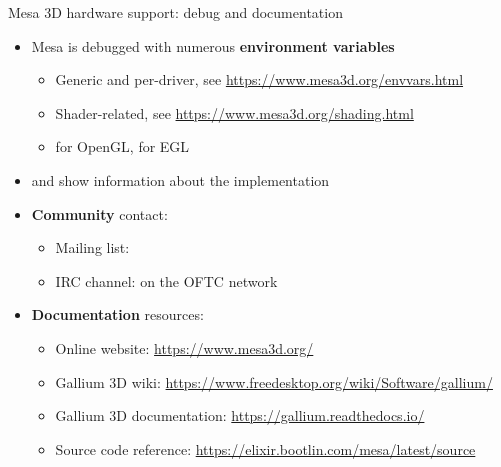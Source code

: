 \begin{frame}[fragile]{Mesa 3D hardware support: debug and documentation}
  \begin{itemize}
  \item Mesa is debugged with numerous \textbf{environment variables}
    \begin{itemize}
    \item Generic and per-driver, see \url{https://www.mesa3d.org/envvars.html}
    \item Shader-related, see \url{https://www.mesa3d.org/shading.html}
    \item {} for OpenGL,  for EGL
    \end{itemize}
  \item {} and  show information about the implementation
  \item \textbf{Community} contact:
    \begin{itemize}
    \item Mailing list: 
    \item IRC channel:  on the OFTC network
    \end{itemize}
  \item \textbf{Documentation} resources:
    \begin{itemize}
    \item Online website: \url{https://www.mesa3d.org/}
    \item Gallium 3D wiki: \url{https://www.freedesktop.org/wiki/Software/gallium/}
    \item Gallium 3D documentation: \url{https://gallium.readthedocs.io/}
    \item Source code reference: \url{https://elixir.bootlin.com/mesa/latest/source}
    \end{itemize}
  \end{itemize}
\end{frame}

